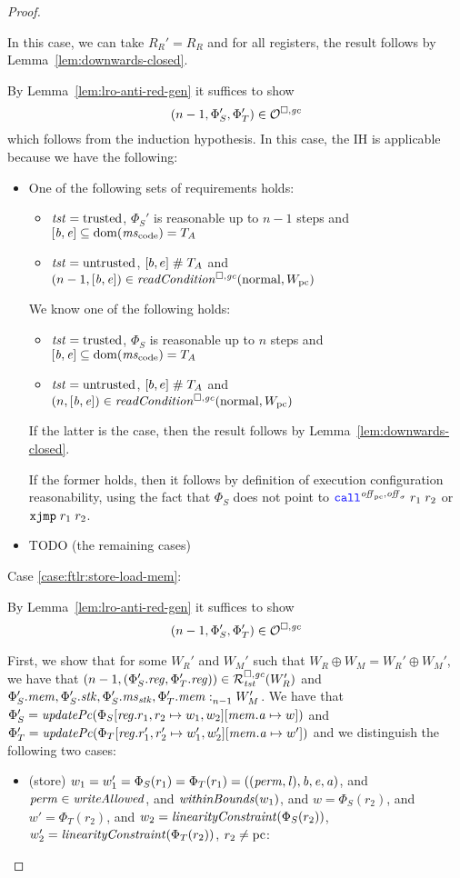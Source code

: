 \begin{proof}
\begin{itemize}
    In this case, we can take $R_R' = R_R$ and for all registers, the result follows by Lemma~\ref{lem:downwards-closed}.
  \end{itemize}


  By Lemma~\ref{lem:lro-anti-red-gen} it suffices to show
  \[
    \npair[n-1]{\Phi_S',\Phi_T'} \in \lro
  \]
  which follows from the induction hypothesis.
  In this case, the IH is applicable because we have the following:
  \begin{itemize}
  \item One of the following sets of requirements holds:
    \begin{itemize}
    \item $\trust = \trusted$, $\Phi_S'$ is reasonable up to $n-1$ steps and $[\baddr,\eaddr] \subseteq \dom(\mscode) = \ta$
    \item $\trust = \untrusted$, $[b,e] \mathrel{\#} \ta$ and $\npair[n-1]{[\baddr,\eaddr]} \in \readCond{\normal,W_\pcreg}$
    \end{itemize}

    We know one of the following holds:
    \begin{itemize}
    \item $\trust = \trusted$, $\Phi_S$ is reasonable up to $n$ steps and $[\baddr,\eaddr] \subseteq \dom(\mscode) = \ta$
    \item $\trust = \untrusted$, $[b,e] \mathrel{\#} \ta$ and $\npair{[\baddr,\eaddr]} \in \readCond{\normal,W_\pcreg}$
    \end{itemize}
    If the latter is the case, then the result follows by Lemma~\ref{lem:downwards-closed}.

    If the former holds, then it follows by definition of execution configuration reasonability, using the fact that $\Phi_S$ does not point to $\scall{\offpc,\offsigma}{r_1}{r_2}$ or $\txjmp{r_1}{r_2}$.

    \item TODO (the remaining cases)
  \end{itemize}

  Case \ref{case:ftlr:store-load-mem}:

  By Lemma~\ref{lem:lro-anti-red-gen} it suffices to show
  \[
    \npair[n-1]{\Phi_S',\Phi_T'} \in \lro
  \]

  First, we show that for some $W_R'$ and $W_M'$ such that $W_R \oplus W_M = W_R' \oplus W_M'$, we have that $\npair[n-1]{(\Phi_S'.\reg,\Phi_T'.\reg)} \in \lrrg{\trust}(W_R')$ and $\memSat[n-1]{\Phi_S'.\mem,\Phi_S'.\stk,\Phi_S'.\ms_\stk,\Phi_T'.\mem}{W_M'}$.
  We have that $\Phi_S' = \updPcAddr{\Phi_S\updReg{r_1,r_2}{w_1,w_2}\update{\mem.\aaddr}{w}}$ and $\Phi_T' = \updPcAddr{\Phi_T\updReg{r_1',r_2'}{w_1',w_2'}\update{\mem.\aaddr}{w'}}$ and we distinguish the following two cases:
  \begin{itemize}
  \item (store) $w_1 = w_1' = \Phi_S(r_1) = \Phi_T(r_1) =
    ((\perm,\lin),\baddr,\eaddr,\aaddr)$, and $\perm \in \writeAllowed{}$,
    and
    $\withinBounds{w_1}$, and
    $w = \Phi_S(r_2)$, and $w' = \Phi_T(r_2)$, and $w_2 = \linCons{\Phi_S(r_2)}$, $w_2' = \linCons{\Phi_T(r_2)}$,  $r_2 \neq \pcreg$:


\end{itemize}
\end{proof}
